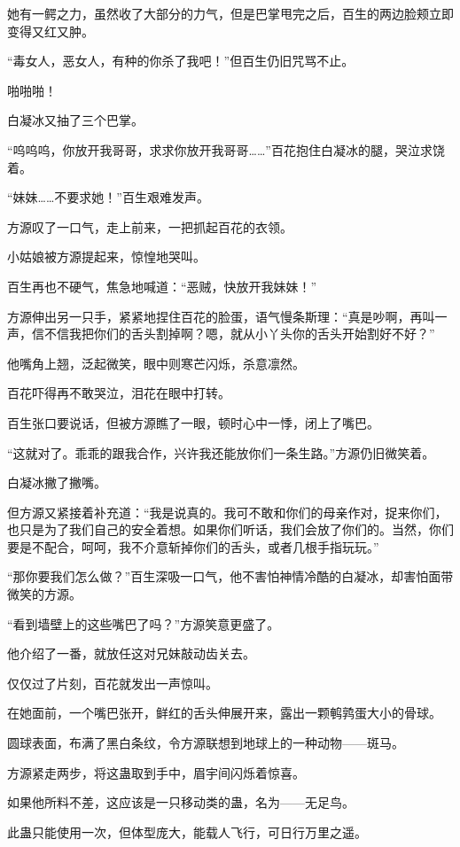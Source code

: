 \begin{this_body}
她有一鳄之力，虽然收了大部分的力气，但是巴掌甩完之后，百生的两边脸颊立即变得又红又肿。

“毒女人，恶女人，有种的你杀了我吧！”但百生仍旧咒骂不止。

啪啪啪！

白凝冰又抽了三个巴掌。

“呜呜呜，你放开我哥哥，求求你放开我哥哥……”百花抱住白凝冰的腿，哭泣求饶着。

“妹妹……不要求她！”百生艰难发声。

方源叹了一口气，走上前来，一把抓起百花的衣领。

小姑娘被方源提起来，惊惶地哭叫。

百生再也不硬气，焦急地喊道：“恶贼，快放开我妹妹！”

方源伸出另一只手，紧紧地捏住百花的脸蛋，语气慢条斯理：“真是吵啊，再叫一声，信不信我把你们的舌头割掉啊？嗯，就从小丫头你的舌头开始割好不好？”

他嘴角上翘，泛起微笑，眼中则寒芒闪烁，杀意凛然。

百花吓得再不敢哭泣，泪花在眼中打转。

百生张口要说话，但被方源瞧了一眼，顿时心中一悸，闭上了嘴巴。

“这就对了。乖乖的跟我合作，兴许我还能放你们一条生路。”方源仍旧微笑着。

白凝冰撇了撇嘴。

但方源又紧接着补充道：“我是说真的。我可不敢和你们的母亲作对，捉来你们，也只是为了我们自己的安全着想。如果你们听话，我们会放了你们的。当然，你们要是不配合，呵呵，我不介意斩掉你们的舌头，或者几根手指玩玩。”

“那你要我们怎么做？”百生深吸一口气，他不害怕神情冷酷的白凝冰，却害怕面带微笑的方源。

“看到墙壁上的这些嘴巴了吗？”方源笑意更盛了。

他介绍了一番，就放任这对兄妹敲动齿关去。

仅仅过了片刻，百花就发出一声惊叫。

在她面前，一个嘴巴张开，鲜红的舌头伸展开来，露出一颗鹌鹑蛋大小的骨球。

圆球表面，布满了黑白条纹，令方源联想到地球上的一种动物——斑马。

方源紧走两步，将这蛊取到手中，眉宇间闪烁着惊喜。

如果他所料不差，这应该是一只移动类的蛊，名为——无足鸟。

此蛊只能使用一次，但体型庞大，能载人飞行，可日行万里之遥。


\end{this_body}
